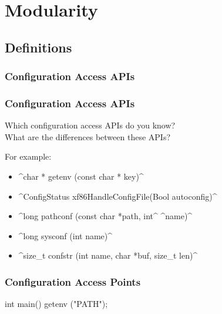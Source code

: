 \section{Modularity}

\subsection{Definitions}

\begin{frame}
	\frametitle{Configuration Access APIs}

	\Large

\end{frame}

\begin{frame}[fragile]
	\frametitle{Configuration Access APIs}

	\begin{task}
	Which configuration access APIs do you know? \\
	What are the differences between these APIs?
	\end{task}

	For example:
	\begin{itemize}[<+-| alert@+>]
	\item ^char * getenv (const char * key)^
	\item ^ConfigStatus xf86HandleConfigFile(Bool autoconfig)^
	\item ^long pathconf (const char *path, int^ ^name)^
	\item ^long sysconf (int name)^
	\item ^size_t confstr (int name, char *buf, size_t len)^
	\end{itemize}
\end{frame}



\begin{frame}[fragile]
	\frametitle{Configuration Access Points}

	\begin{code}[language=Cpp,gobble=4,showspaces=no]
	int main()
	{
		getenv ("PATH");
	}
	\end{code}
\end{frame}

